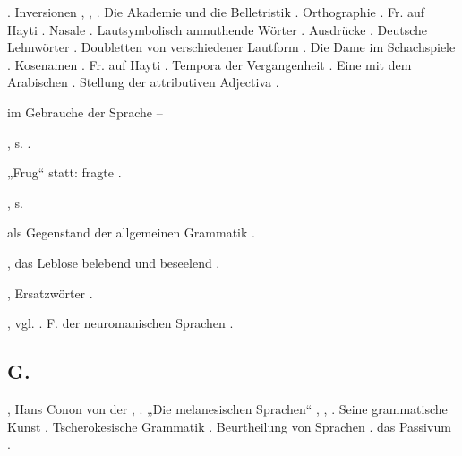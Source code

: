\begin{register}
. Inversionen \pageref{sp.103}, \pageref{sp.370}, \pageref{sp.371}. Die Akademie und die Belletristik \pageref{sp.126}. Orthographie \pageref{sp.132}. Fr. auf Hayti \pageref{sp.147}. Nasale \pageref{sp.148}.  Lautsymbolisch anmuthende Wörter \pageref{sp.219}.  Ausdrücke \pageref{sp.243}. Deutsche Lehnwörter \pageref{sp.264}. Doubletten von verschiedener Lautform \pageref{sp.267}. Die Dame im Schachspiele \pageref{sp.268}. Kosenamen \pageref{sp.278}. Fr. auf Hayti \pageref{sp.293}.  Tempora der Vergangenheit \pageref{sp.430}. Eine  mit dem Arabischen \pageref{sp.441}.  Stellung der attributiven Adjectiva \pageref{sp.457}. 

 im Gebrauche der Sprache \pageref{sp.234}–\pageref{sp.239}

, s. .

„Frug“ statt: fragte \pageref{sp.186}.

, s. 

 als Gegenstand der allgemeinen Grammatik \pageref{sp.480}.

, das Leblose belebend und beseelend \pageref{sp.315}.

, Ersatzwörter \pageref{sp.101}.

, vgl.  \pageref{sp.103}. F. der neuromanischen Sprachen \sed{\pageref{sp.159},} \pageref{sp.348}.

\subsection*{G.}\label{reg.G}

, Hans Conon von der \pageref{sp.30}, \pageref{sp.49}. „Die melanesischen Sprachen“ \pageref{sp.74}, \sed{\pageref{sp.151},} \pageref{sp.280}, \pageref{sp.406}. Seine grammatische Kunst \pageref{sp.112}. Tscherokesische Grammatik \pageref{sp.358}.  Beurtheilung von Sprachen \pageref{sp.427}.  das Passivum \pageref{sp.481}.



\end{register}
